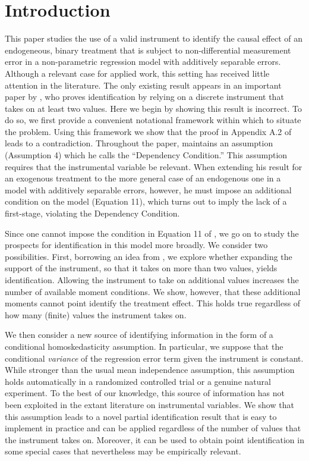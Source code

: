 \section{Introduction}

This paper studies the use of a valid instrument to identify the causal effect of an endogeneous, binary treatment that is subject to non-differential measurement error in a non-parametric regression model with additively separable errors. 
Although a relevant case for applied work, this setting has received little attention in the literature.
The only existing result appears in an important paper by \cite{Mahajan}, who proves identification by relying on a discrete instrument that takes on at least two values.   
Here we begin by showing this result is incorrect. 
To do so, we first provide a convenient notational framework within which to situate the problem.
Using this framework we show that the proof in Appendix A.2 of \cite{Mahajan} leads to a contradiction.
Throughout the paper, \cite{Mahajan} maintains an assumption (Assumption 4) which he calls the ``Dependency Condition.'' 
This assumption requires that the instrumental variable be relevant.
When extending his result for an exogenous treatment to the more general case of an endogenous one in a model with additively separable errors, however, he must impose an additional condition on the model (Equation 11), which turns out to imply the lack of a first-stage, violating the Dependency Condition.

Since one cannot impose the condition in Equation 11 of \cite{Mahajan}, we go on to study the prospects for identification in this model more broadly.
We consider two possibilities.
First, borrowing an idea from \cite{Lewbel}, we explore whether expanding the support of the instrument, so that it takes on more than two values, yields identification.
Allowing the instrument to take on additional values increases the number of available moment conditions.
We show, however, that these additional moments cannot point identify the treatment effect.
This holds true regardless of how many (finite) values the instrument takes on.

We then consider a new source of identifying information in the form of a conditional homoskedasticity assumption. 
In particular, we suppose that the conditional \emph{variance} of the regression error term given the instrument is constant.
While stronger than the usual mean independence assumption, this assumption holds automatically in a randomized controlled trial or a genuine natural experiment. 
To the best of our knowledge, this source of information has not been exploited in the extant literature on instrumental variables.  
We show that this assumption leads to a novel partial identification result that is easy to implement in practice and can be applied regardless of the number of values that the instrument takes on.
Moreover, it can be used to obtain point identification in some special cases that nevertheless may be empirically relevant. 

